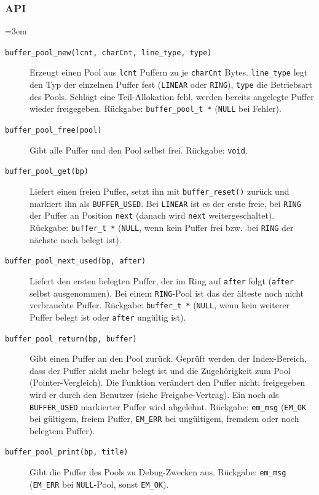 \subsubsection*{API}
{\sloppy\emergencystretch=3em
\begin{description}
\item[\texttt{buffer\_pool\_new(lcnt, charCnt, line\_type, type)}] Erzeugt
  einen Pool aus \verb|lcnt| Puffern zu je \verb|charCnt| Bytes. \verb|line_type|
  legt den Typ der einzelnen Puffer fest (\verb|LINEAR| oder \verb|RING|),
  \verb|type| die Betriebsart des Pools. Schlägt eine Teil-Allokation fehl,
  werden bereits angelegte Puffer wieder freigegeben. Rückgabe:
  \verb|buffer_pool_t *| (\verb|NULL| bei Fehler).
\item[\texttt{buffer\_pool\_free(pool)}] Gibt alle Puffer und den Pool selbst
  frei. Rückgabe: \verb|void|.
\item[\texttt{buffer\_pool\_get(bp)}] Liefert einen freien Puffer, setzt ihn
  mit \verb|buffer_reset()| zurück und markiert ihn als \verb|BUFFER_USED|.
  Bei \verb|LINEAR| ist es der erste freie, bei \verb|RING| der Puffer an
  Position \verb|next| (danach wird \verb|next| weitergeschaltet). Rückgabe:
  \verb|buffer_t *| (\verb|NULL|, wenn kein Puffer frei bzw.\ bei
  \verb|RING| der nächste noch belegt ist).
\item[\texttt{buffer\_pool\_next\_used(bp, after)}] Liefert den ersten
  belegten Puffer, der im Ring auf \verb|after| folgt (\verb|after| selbst
  ausgenommen). Bei einem \verb|RING|-Pool ist das der älteste noch nicht
  verbrauchte Puffer. Rückgabe: \verb|buffer_t *| (\verb|NULL|, wenn kein
  weiterer Puffer belegt ist oder \verb|after| ungültig ist).
\item[\texttt{buffer\_pool\_return(bp, buffer)}] Gibt einen Puffer an den Pool
  zurück. Geprüft werden der Index-Bereich, dass der Puffer nicht mehr belegt
  ist und die Zugehörigkeit zum Pool (Pointer-Vergleich). Die Funktion
  verändert den Puffer nicht; freigegeben wird er durch den Benutzer (siehe
  Freigabe-Vertrag). Ein noch als \verb|BUFFER_USED| markierter Puffer wird
  abgelehnt. Rückgabe: \verb|em_msg| (\verb|EM_OK| bei gültigem, freiem
  Puffer, \verb|EM_ERR| bei ungültigem, fremdem oder noch belegtem Puffer).
\item[\texttt{buffer\_pool\_print(bp, title)}] Gibt die Puffer des Pools zu
  Debug-Zwecken aus. Rückgabe: \verb|em_msg| (\verb|EM_ERR| bei
  \verb|NULL|-Pool, sonst \verb|EM_OK|).
\end{description}
\par}
